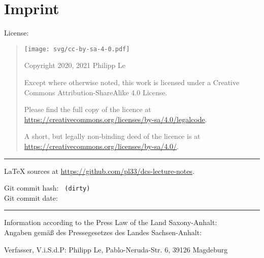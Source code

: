 %
%
%

\chapter*{Imprint}

{
\small

License:

\begin{quote}
	\texttt{[image: svg/cc-by-sa-4-0.pdf]}
		
	Copyright \textcopyright{} 2020, 2021 Philipp Le
	
	Except where otherwise noted, this work is licensed under a
	Creative Commons Attribution-ShareAlike 4.0 License.
	
	Please find the full copy of the licence at \url{https://creativecommons.org/licenses/by-sa/4.0/legalcode}.
	
	A short, but legally non-binding deed of the licence is at \url{https://creativecommons.org/licenses/by-sa/4.0/}.
\end{quote}

\vspace{1.5em}

\hrule{}

\vspace{1.5em}

\LaTeX{} sources at \url{https://github.com/pl33/dcs-lecture-notes}.

Git commit hash: \texttt{\VcsCommitHashLong{} \ifdefined\VcsIsClean \else (dirty) \fi}\\
Git commit date: \texttt{\VcsCommitTime}

\vspace{1.5em}

\hrule{}

\vspace{1.5em}

Information according to the Press Law of the Land Saxony-Anhalt:\\
Angaben gem\"a{}{\ss} des Pressegesetzes des Landes Sachsen-Anhalt:

Verfasser, V.i.S.d.P: Philipp Le, Pablo-Neruda-Str. 6, 39126 Magdeburg

}
